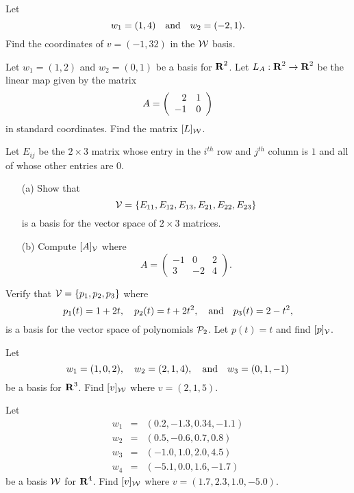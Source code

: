 \EXER

\TEXER

\begin{exercise} \label{c7.1.1}
Let
\[
w_1 = (1,4) \quad\mbox{and}\quad w_2 = (-2,1).
\]
Find the coordinates of $v=(-1,32)$ in the ${\cal W}$ basis.
\end{exercise}

\begin{exercise} \label{c7.3.1}
Let $w_1=(1,2)$ and $w_2=(0,1)$ be a basis for $\mbox{$\bf{R}$}^2$.  Let
$L_A:\mbox{$\bf{R}$}^2\to\mbox{$\bf{R}$}^2$ be the linear map given by the matrix
\[
A=\left(\begin{array}{rr} 2 & 1\\ -1 &0\end{array}\right)
\]
in standard coordinates.  Find the matrix $[L]_{\cal W}$.
\end{exercise}

\begin{exercise} \label{c7.1.3}
Let $E_{ij}$ be the $2\times 3$ matrix whose entry in the
$i^{th}$ row and $j^{th}$ column is $1$ and all of whose
other entries are $0$.
\begin{itemize}
\item[(a)]  Show that
\[
{\cal V}=\{E_{11},E_{12},E_{13},E_{21},E_{22},E_{23}\}
\]
is a basis for the vector space of $2\times 3$ matrices.
\item[(b)]   Compute $[A]_{\cal V}$ where
\[
A=\left(\begin{array}{rrr} -1 & 0 & 2\\ 3 & -2 & 4\end{array}\right).
\]
\end{itemize}
\end{exercise}

\begin{exercise} \label{c7.1.4}
Verify that ${\cal V}= \{p_1,p_2,p_3\}$ where
\[
p_1(t)=1+2t, \quad p_2(t)=t+2t^2, \quad\mbox{and}\quad p_3(t)=2-t^2,
\]
is a basis for the vector space of polynomials ${\cal P}_2$.
Let $p(t)=t$ and find $[p]_{\cal V}$.
\end{exercise}

\CEXER


\begin{exercise} \label{c7.1.6}
Let
\[
w_1=(1,0,2), \quad w_2=(2,1,4), \quad\mbox{and}\quad w_3=(0,1,-1)
\]
be a basis for $\mbox{$\bf{R}$}^3$.  Find $[v]_{\cal W}$ where $v=(2,1,5)$.
\end{exercise}

\begin{exercise} \label{c7.1.7}
Let
\begin{equation*}
\begin{array}{ccl}
w_1 & = & (0.2,-1.3,0.34,-1.1)\\
w_2 & = & (0.5,-0.6,0.7,0.8)\\
w_3 & = & (-1.0,1.0,2.0,4.5) \\
w_4 & = & (-5.1,0.0,1.6,-1.7) \end{array}
\end{equation*}
be a basis ${\cal W}$ for $\mbox{$\bf{R}$}^4$.  Find $[v]_{\cal W}$ where
$v=(1.7,2.3,1.0,-5.0)$.
\end{exercise}


